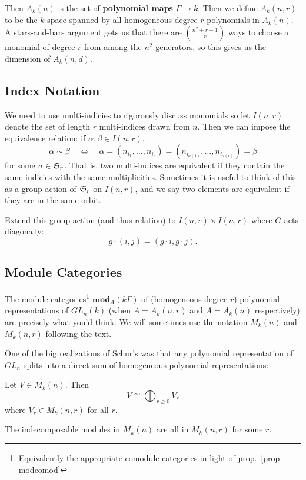 \documentclass[12pt]{article}
\DeclareMathOperator{\1}{\mathbbm{1}}
\begin{document}
Then $A_k(n)$ is the set of \textbf{polynomial maps} $\Gamma\to k$. Then we define $A_k(n,r)$ to be the $k$-space spanned by all homogeneous degree $r$ 
polynomials in $A_k(n)$. A stars-and-bars argument gets us that there are $\binom{n^2+r-1}{r}$ ways to choose a monomial of degree $r$ from among the $n^2$ generators,
so this gives us the dimension of $A_k(n,d)$.

\subsection{Index Notation}
We need to use multi-indicies to rigorously discuss monomials so let $I(n,r)$ denote the set of length $r$ multi-indices drawn from $\underline n$. Then 
we can impose the equivalence relation: if $\alpha,\beta\in I(n,r)$,
\[\alpha\sim\beta \quad\Leftrightarrow\quad \alpha=(n_{i_1},\dots,n_{i_r})=(n_{i_{\sigma(1)}},\dots, n_{i_{\sigma(r)}})=\beta\]
for some $\sigma\in\mathfrak{S}_r$. That is, two multi-indices are equivalent if they contain the same indicies with the same multiplicities. Sometimes it is useful to think 
of this as a group action of $\mathfrak{S}_r$ on $I(n,r)$, and we say two elements are equivalent if they are in the same orbit.

Extend this group action (and thus relation) to $I(n,r)\times I(n,r)$ where $G$ acts diagonally:
\[g\cdot(i,j)=(g\cdot i,g\cdot j).\]

\subsection{Module Categories}
The module categories\footnote{Equivalently the appropriate comodule categories in light of prop.~\ref{prop-modcomod}} $\mathbf{mod}_{A}(k\Gamma)$ of 
(homogeneous degree $r$) polynomial representations of $GL_n(k)$ (when $A=A_k(n,r)$ and $A=A_k(n)$ respectively) are precisely what you'd think. We will sometimes 
use the notation $M_k(n)$ and $M_k(n,r)$ following the text.

One of the big realizations of Schur's was that any polynomial representation of $GL_n$ splits into a direct sum of homogeneous polynomial representations:
\begin{thm}
	Let $V\in M_k(n)$. Then 
	\[V\cong \bigoplus_{r\ge 0} V_r\]
	where $V_r\in M_k(n,r)$ for all $r$.
\end{thm}
\begin{cor}
	The indecomposable modules in $M_k(n)$ are all in $M_k(n,r)$ for some $r$.
\end{cor}
\end{document}
